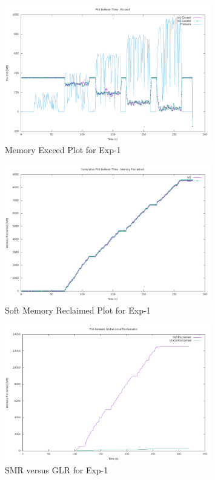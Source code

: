       	\begin{figure}
	  \centering
	  \includegraphics[width=0.8\textwidth]{images/experimentation/exceed_only/1/Exceed.png}
	  \caption{Memory Exceed Plot for Exp-1}
	  \label{img_exceed_only_1_exceed}
	\end{figure}
	
	\begin{figure}
	  \centering
	  \includegraphics[width=0.8\textwidth]{images/experimentation/exceed_only/1/Memory_Reclaimed.png}
	  \caption{Soft Memory Reclaimed Plot for Exp-1}
	  \label{img_exceed_only_1_smr}
	\end{figure}
	
	\begin{figure}
	  \centering
	  \includegraphics[width=0.8\textwidth]{images/experimentation/smr_glr/1/compare.png}
	  \caption{SMR versus GLR for Exp-1}
	  \label{img_exceed_only_1_compare}
	\end{figure}
	
